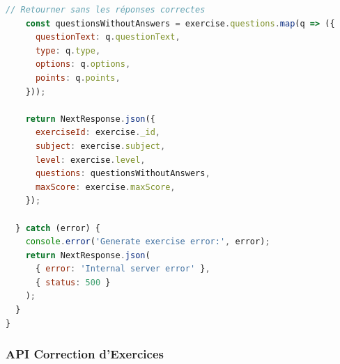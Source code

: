 \begin{lstlisting}[language=JavaScript, caption=API Route pour générer des exercices, label=code:api-exercises]
    // Retourner sans les réponses correctes
    const questionsWithoutAnswers = exercise.questions.map(q => ({
      questionText: q.questionText,
      type: q.type,
      options: q.options,
      points: q.points,
    }));

    return NextResponse.json({
      exerciseId: exercise._id,
      subject: exercise.subject,
      level: exercise.level,
      questions: questionsWithoutAnswers,
      maxScore: exercise.maxScore,
    });

  } catch (error) {
    console.error('Generate exercise error:', error);
    return NextResponse.json(
      { error: 'Internal server error' },
      { status: 500 }
    );
  }
}
\end{lstlisting}

\subsubsection{API Correction d'Exercices}

